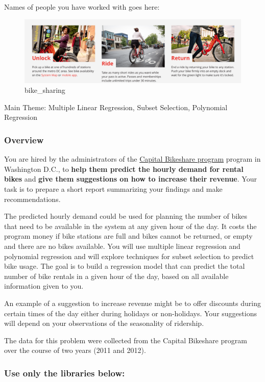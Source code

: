 \documentclass[11pt]{article}
\makeatletter
\def\maxwidth{\ifdim\Gin@nat@width>\linewidth\linewidth
    \else\Gin@nat@width\fi}
\let\Oldincludegraphics\includegraphics
\renewcommand{\includegraphics}[1]{\Oldincludegraphics[width=.8\maxwidth]{#1}}
\makeatother
\begin{document}
Names of people you have worked with goes here:

    

    \begin{figure}
\centering
\includegraphics{fig/BSS.png}
\caption{bike\_sharing}
\end{figure}

Main Theme: Multiple Linear Regression, Subset Selection, Polynomial
Regression

\subsubsection{Overview}\label{overview}

You are hired by the administrators of the
\href{https://www.capitalbikeshare.com}{Capital Bikeshare program}
program in Washington D.C., to \textbf{help them predict the hourly
demand for rental bikes} and \textbf{give them suggestions on how to
increase their revenue}. Your task is to prepare a short report
summarizing your findings and make recommendations.

The predicted hourly demand could be used for planning the number of
bikes that need to be available in the system at any given hour of the
day. It costs the program money if bike stations are full and bikes
cannot be returned, or empty and there are no bikes available. You will
use multiple linear regression and polynomial regression and will
explore techniques for subset selection to predict bike usage. The goal
is to build a regression model that can predict the total number of bike
rentals in a given hour of the day, based on all available information
given to you.

An example of a suggestion to increase revenue might be to offer
discounts during certain times of the day either during holidays or
non-holidays. Your suggestions will depend on your observations of the
seasonality of ridership.

The data for this problem were collected from the Capital Bikeshare
program over the course of two years (2011 and 2012).

    \subsubsection{Use only the libraries
below:}\label{use-only-the-libraries-below}
\end{document}
